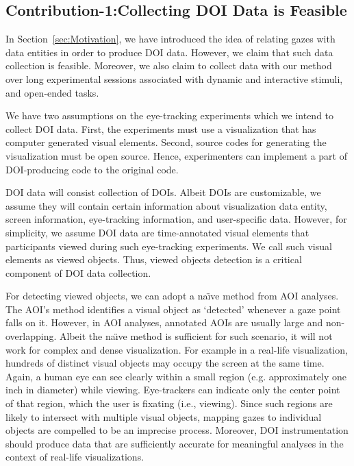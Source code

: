 \subsection{Contribution-1:Collecting DOI Data is Feasible}
\label{sec:Contribution-1}
In Section~\ref{sec:Motivation}, we have introduced the idea of relating gazes with data entities in order to produce DOI data. However, we claim that such data collection is feasible. Moreover, we also claim to collect data with our method over long experimental sessions associated with dynamic and interactive stimuli, and open-ended tasks. 

We have two assumptions on the eye-tracking experiments which we intend to collect DOI data. First, the experiments must use a visualization that has computer generated visual elements. Second, source codes for generating the visualization must be open source. Hence, experimenters can implement a part of DOI-producing code to the original code. 

DOI data will consist collection of DOIs. Albeit DOIs are customizable, we assume they will contain certain information about visualization data entity, screen information, eye-tracking information, and user-specific data. However, for simplicity, we assume DOI data are time-annotated visual elements that participants viewed during such eye-tracking experiments. We call such visual elements as viewed objects. Thus, viewed objects detection is a critical component of DOI data collection.

For detecting viewed objects, we can adopt a na\"{\i}ve method from AOI analyses. The AOI's method identifies a visual object as `detected' whenever a gaze point falls on it. However, in AOI analyses, annotated AOIs are usually large and non-overlapping. Albeit the na\"{\i}ve method is sufficient for such scenario, it will not work for complex and dense visualization. For example in a real-life visualization, hundreds of distinct visual objects may occupy the screen at the same time. Again, a human eye can see clearly within a small region (e.g. approximately one inch in diameter) while viewing. Eye-trackers can indicate only the center point of that region, which the user is fixating (i.e., viewing). Since such regions are likely to intersect with multiple visual objects, mapping gazes to individual objects are compelled to be an imprecise process. Moreover, DOI instrumentation should produce data that are sufficiently accurate for meaningful analyses in the context of real-life visualizations.

